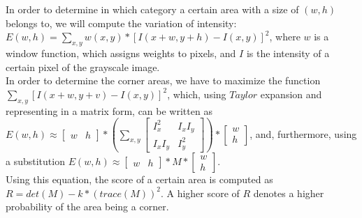 In order to determine in which category a certain area with a size of $(w, h)$ belongs to, we will compute the variation of intensity: $E(w, h) = \sum_{x, y} w(x, y) * [I(x + w, y + h) - I(x, y)]^2$, where $w$ is a window function, which assigns weights to pixels, and $I$ is the intensity of a certain pixel of the grayscale image.\\
In order to determine the corner areas, we have to maximize the function $\sum_{x, y}[I(x + w, y + v) - I(x, y)]^2$, which, using $Taylor$ expansion and representing in a matrix form, can be written as
$E(w, h) \approx
\begin{bmatrix}
w & h
\end{bmatrix} * 
\left(\sum_{x, y}
\begin{bmatrix}
I_x^2 & I_xI_y\\
I_xI_y & I_y^2
\end{bmatrix}
\right) *
\begin{bmatrix}
w \\
h
\end{bmatrix}$, and, furthermore, using a substitution
$E(w, h) \approx
\begin{bmatrix}
w & h
\end{bmatrix} * 
M *
\begin{bmatrix}
w \\
h
\end{bmatrix}$.\\
Using this equation, the score of a certain area is computed as $R = det(M) - k * (trace(M))^2$. A higher score of $R$ denotes a higher probability of the area being a corner.


